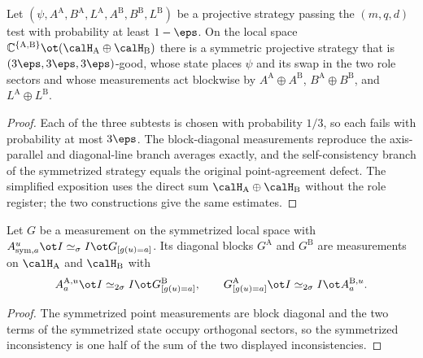 \begin{lemma}\label{lem:role-register-symmetrization}
	\leanok
	Let
	$(\psi,A^{\mathrm A},B^{\mathrm A},L^{\mathrm A},A^{\mathrm B},B^{\mathrm B},L^{\mathrm B})$
	be a projective strategy passing the $(m,q,d)$ test with probability at
	least $1-\eps$.  On the local space
	$\mathbb C^{\{\mathrm A,\mathrm B\}}\ot(\calH_{\mathrm A}\oplus\calH_{\mathrm B})$
	there is a symmetric projective strategy that is
	$(3\eps,3\eps,3\eps)$-good, whose state places $\psi$ and its swap in the
	two role sectors and whose measurements act blockwise by
	$A^{\mathrm A}\oplus A^{\mathrm B}$, $B^{\mathrm A}\oplus B^{\mathrm B}$,
	and $L^{\mathrm A}\oplus L^{\mathrm B}$.
\end{lemma}
\begin{proof}
	\leanok
	Each of the three subtests is chosen with probability $1/3$, so each
	fails with probability at most $3\eps$.  The block-diagonal measurements
	reproduce the axis-parallel and diagonal-line branch averages exactly, and
	the self-consistency branch of the symmetrized strategy equals the
	original point-agreement defect.  The simplified exposition uses the
	direct sum $\calH_{\mathrm A}\oplus\calH_{\mathrm B}$ without the role
	register; the two constructions give the same estimates.
\end{proof}

\begin{lemma}\label{lem:role-register-extraction}
	\leanok
	Let $G$ be a measurement on the symmetrized local space with
	$A^u_{\mathrm{sym},a}\ot I\simeq_\sigma I\ot G_{[g(u)=a]}$.  Its diagonal
	blocks $G^{\mathrm A}$ and $G^{\mathrm B}$ are measurements on
	$\calH_{\mathrm A}$ and $\calH_{\mathrm B}$ with
	\[
		A^{\mathrm A,u}_a\ot I\simeq_{2\sigma}I\ot G^{\mathrm B}_{[g(u)=a]},
		\qquad
		G^{\mathrm A}_{[g(u)=a]}\ot I\simeq_{2\sigma}I\ot A^{\mathrm B,u}_a.
	\]
\end{lemma}
\begin{proof}
	\leanok
	The symmetrized point measurements are block diagonal and the two terms
	of the symmetrized state occupy orthogonal sectors, so the symmetrized
	inconsistency is one half of the sum of the two displayed inconsistencies.
\end{proof}

